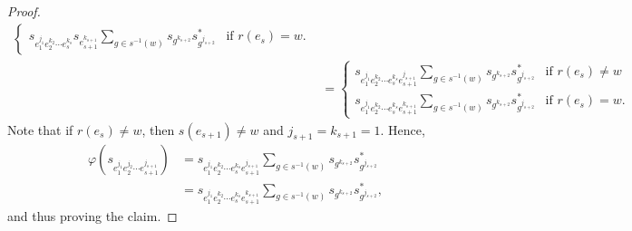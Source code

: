 \documentclass[12pt]{amsbook}%
\renewcommand{\phi}{\varphi}
\theoremstyle{defin}
\theoremstyle{remark}
\numberwithin{equation}{chapter}
\numberwithin{theor}{section}
\begin{document}
\begin{proof}
\begin{align*}
\begin{cases}
\displaystyle s_{ e_1^{ j_1 } e_2^{ k_2 } \cdots e_{s}^{k_s} } s_{e_{s+1}^{k_{s+1}}}    \sum_{ g \in s^{-1} (w) }  s_{g^ { k_{s+2} } } s_{ g^{ j_{s+2} } }^*  &\text{if  } r(e_s)=w.
\end{cases}  \\
&=\begin{cases}
\displaystyle s_{ e_1^{ j_1 } e_2^{ k_2 } \cdots e_{s}^{k_s} e_{s+1}^{j_{s+1}}}  \sum_{ g \in s^{-1} (w) }  s_{g^ { k_{s+2} } } s_{ g^{ j_{s+2} } }^* &\text{if } r( e_s ) \neq w  \\ 
\displaystyle s_{ e_1^{ j_1 } e_2^{ k_2 } \cdots e_{s}^{k_s} e_{s+1}^{k_{s+1}}}    \sum_{ g \in s^{-1} (w) }  s_{g^ { k_{s+2} } } s_{ g^{ j_{s+2} } }^*  &\text{if  } r(e_s)=w.
\end{cases}  
\end{align*}
Note that if $r( e_s ) \neq w$, then $s( e_{s+1} ) \neq w$ and $j_{s+1} = k_{s+1} = 1$.  Hence, 
\begin{align*}
\phi (  s_{ e_1^{j_1} e_{2}^{j_2} \cdots e_{s+1}^{j_{s+1}} } )   &= s_{ e_1^{ j_1 } e_2^{ k_2 } \cdots e_{s}^{k_s} e_{s+1}^{j_{s+1}}}    \sum_{ g \in s^{-1} (w) }  s_{g^ { k_{s+2} } } s_{ g^{ j_{s+2} } }^* \\
&= s_{ e_1^{ j_1 } e_2^{ k_2 } \cdots e_{s}^{k_s} e_{s+1}^{k_{s+1}}}   \sum_{ g \in s^{-1} (w) }  s_{g^ { k_{s+2} } } s_{ g^{ j_{s+2} } }^*,
\end{align*}
and thus proving the claim.  


\end{proof}
\end{document}
